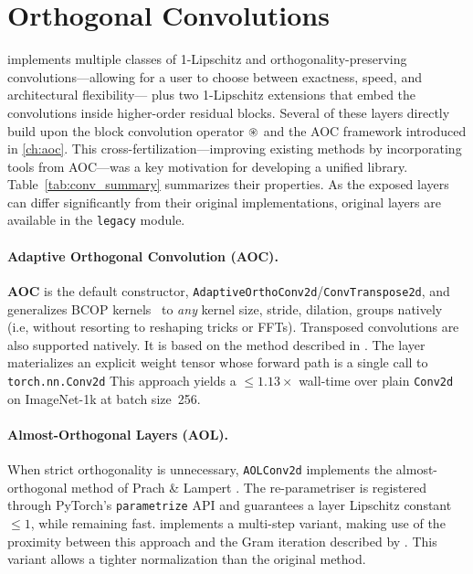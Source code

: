\section{Orthogonal Convolutions}
\label{sec:conv}
    
    \Orthogonium implements multiple classes of 1-Lipschitz and orthogonality-preserving
    convolutions—allowing for a user to choose between exactness,
    speed, and architectural flexibility— plus two 1-Lipschitz extensions
    that embed the convolutions inside higher-order residual blocks.
    Several of these layers directly build upon the block convolution operator $\circledast$ and the AOC framework introduced in \cref{ch:aoc}. This cross-fertilization—improving existing methods by incorporating tools from AOC—was a key motivation for developing a unified library.
    Table~\ref{tab:conv_summary} summarizes their properties. As the exposed layers can differ significantly from their original implementations, original layers are available in the \texttt{legacy} module.

    \paragraph{Adaptive Orthogonal Convolution (AOC).}
    
    \textbf{AOC} is the default constructor, \verb|AdaptiveOrthoConv2d|/\verb|ConvTranspose2d|, and generalizes BCOP kernels~\cite{li_preventing_2019} to \emph{any} kernel size, stride, dilation, groups natively (i.e, without resorting to     reshaping tricks or FFTs). Transposed convolutions are also supported natively. It is based on the method described in \cite{boissin2025adaptive}.  The layer materializes an explicit weight tensor whose forward path is a single call to \verb|torch.nn.Conv2d| This approach yields a \(\le1.13\times\) wall-time over plain \verb|Conv2d| on ImageNet-1k at batch size~256.
     
    \paragraph{Almost-Orthogonal Layers (AOL).}
    When strict orthogonality is unnecessary, \verb|AOLConv2d| implements the almost-orthogonal method of Prach \& Lampert \cite{prach_almost-orthogonal_2022}.  The
    re-parametriser is registered through PyTorch's
    \verb|parametrize| API and guarantees a layer Lipschitz constant
    \(\le1\), while remaining fast. \Orthogonium 
    implements a multi-step variant, making use of the proximity between this approach and the Gram 
    iteration described by \cite{delattre2024spectral}. This variant allows a tighter normalization than the original method.

